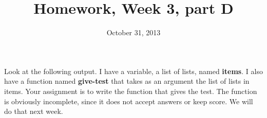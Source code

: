 \documentclass{article}
\title{Homework, Week 3, part D}
\date{October 31, 2013}
\begin{document}
\maketitle{}

\paragraph{}Look at the following output. I have a variable, a list of lists, named \textbf{items}. I also have a function named \textbf{give-test} that takes as an argument the list of lists in items. Your assignment is to write the function that gives the test. The function is obviously incomplete, since it does not accept answers or keep score. We will do that next week.

\lstset{language=Lisp,numbers=left,keepspaces=false,basicstyle=\small,numberstyle=\tiny,breaklines=true,showstringspaces=false}
\end{document}

